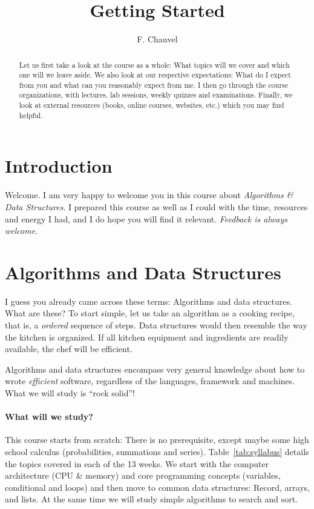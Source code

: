 \documentclass{aldast}
\title{Getting Started}
\author{F. Chauvel}
\begin{document}
\maketitle

\begin{abstract}
  Let us first take a look at the course as a whole: What topics will
  we cover and which one will we leave aside. We also look at our
  respective expectations: What do I expect from you and what can you
  reasonably expect from me. I then go through the course
  organizations, with lectures, lab sessions, weekly quizzes and
  examinations. Finally, we look at external resources (books, online
  courses, websites, etc.) which you may find helpful.
\end{abstract}


\section*{Introduction}
Welcome. I am very
happy to welcome you in this course about \emph{Algorithms \& Data
  Structures}. I prepared this course as well as I could with the
time, resources and energy I had, and I do hope you will find it
relevant. \emph{Feedback is always welcome.}


\section{Algorithms and Data Structures}
I guess you already came across these terms: Algorithms and data
structures. What are these? To start simple, let us take an algorithm
as a cooking recipe, that is, a \emph{ordered} sequence of steps. Data
structures would then resemble the way the kitchen is organized. If all
kitchen equipment and ingredients are readily available, the chef will
be efficient.

Algorithms and data structures encompass very general knowledge about
how to wrote \emph{efficient} software, regardless of the languages,
framework and machines. What we will study is ``rock solid''!

\paragraph{What will we study?} This course starts from scratch: There
is no prerequisite, except maybe some high school calculus
(probabilities, summations and series). Table~\ref{tab:syllabus}
details the topics covered in each of the 13 weeks. We start with the
computer architecture (CPU \& memory) and core programming concepts
(variables, conditional and loops) and then move to common data
structures: Record, arrays, and lists. At the same time we will study
simple algorithms to search and sort.
\end{document}
